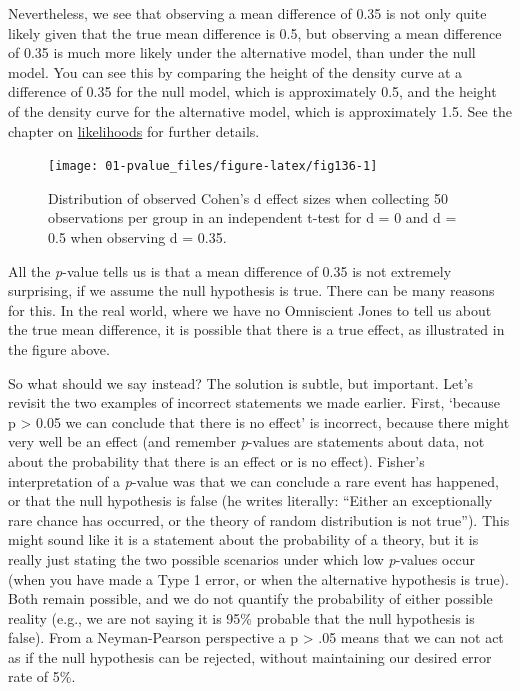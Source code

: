 \documentclass[
]{krantz}
\begin{document}
Nevertheless, we see that observing a mean difference of 0.35 is not only quite likely given that the true mean difference is 0.5, but observing a mean difference of 0.35 is much more likely under the alternative model, than under the null model. You can see this by comparing the height of the density curve at a difference of 0.35 for the null model, which is approximately 0.5, and the height of the density curve for the alternative model, which is approximately 1.5. See the chapter on \protect\hyperlink{likettest}{likelihoods} for further details.

\begin{figure}

{\centering \texttt{[image: 01-pvalue\_files/figure-latex/fig136-1]} 

}

\caption{Distribution of observed Cohen's d effect sizes when collecting 50 observations per group in an independent t-test for d = 0 and d = 0.5 when observing d = 0.35.}\label{fig:fig136}
\end{figure}

All the \emph{p}-value tells us is that a mean difference of 0.35 is not extremely surprising, if we assume the null hypothesis is true. There can be many reasons for this. In the real world, where we have no Omniscient Jones to tell us about the true mean difference, it is possible that there is a true effect, as illustrated in the figure above.

So what should we say instead? The solution is subtle, but important. Let's revisit the two examples of incorrect statements we made earlier. First, `because p \textgreater{} 0.05 we can conclude that there is no effect' is incorrect, because there might very well be an effect (and remember \emph{p}-values are statements about data, not about the probability that there is an effect or is no effect). Fisher's interpretation of a \emph{p}-value was that we can conclude a rare event has happened, or that the null hypothesis is false (he writes literally: ``Either an exceptionally rare chance has occurred, or the theory of random distribution is not true''). This might sound like it is a statement about the probability of a theory, but it is really just stating the two possible scenarios under which low \emph{p}-values occur (when you have made a Type 1 error, or when the alternative hypothesis is true). Both remain possible, and we do not quantify the probability of either possible reality (e.g., we are not saying it is 95\% probable that the null hypothesis is false). From a Neyman-Pearson perspective a p \textgreater{} .05 means that we can not act as if the null hypothesis can be rejected, without maintaining our desired error rate of 5\%.
\end{document}
